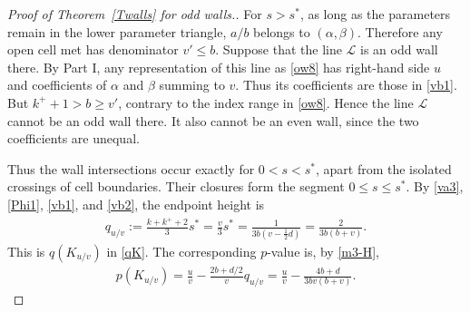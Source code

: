 \documentclass[11pt,reqno,tbtags,a4paper]{amsart}
\numberwithin{equation}{section}
\renewcommand\le{\leq}
\renewcommand\ge{\geq}
\renewcommand\leq{\leqslant}
\renewcommand\geq{\geqslant}
\theoremstyle{plain}%
\theoremstyle{definition}
\theoremstyle{remark}
\newcommand{\refT}[1]{Theorem~\ref{#1}}
\newcounter{cc}
\newcommand\ga{\alpha}
\newcommand\gb{\beta}
\newcommand\LL{{\mathcal L}}
\newcommand\uv{_{u/v}}
\newcommand\kx{{k^+}}
\newcommand\sx{s^*}
\newcommand\0{{\boldsymbol 0}}
\newcommand\1{{\boldsymbol 1}}
\begin{document}
\begin{proof}[Proof of \refT{Twalls} for odd walls.]
For $s>\sx$, as long as the parameters remain in the lower parameter
triangle, $a/b$ belongs to $(\ga,\gb)$.
Therefore any open cell met has denominator $v'\le b$.
Suppose that the line $\LL$ is an odd wall there.
By Part I, any representation of this line as \eqref{ow8} has
right-hand side $u$ and coefficients of $\ga$ and $\gb$ summing to $v$.
Thus its coefficients are those in \eqref{vb1}.
But $\kx+1>b\ge v'$, contrary to the index range in \eqref{ow8}.
Hence the line $\LL$ cannot be an odd wall there.
It also cannot be an even wall, since the two coefficients are unequal.

Thus the wall intersections occur exactly for $0<s<\sx$, apart from the
isolated crossings of cell boundaries. Their closures form the segment
$0\le s\le\sx$.
By \eqref{va3}, \eqref{Phi1}, \eqref{vb1}, and \eqref{vb2},
the endpoint height is
\begin{align}\label{vb5}
 q\uv:=\frac{k+\kx+2}{3}\sx
 =\frac{v}{3}\sx
 =\frac{1}{3b(v-\frac12d)}
 =\frac{2}{3b(b+v)}.
\end{align}
This is $q(K\uv)$ in \eqref{qK}.
The corresponding $p$-value is, by \eqref{m3-H},
\begin{align}\label{vb6}
 p(K\uv)=\frac{u}v-\frac{2b+d/2}{v}q\uv
 =\frac{u}v-\frac{4b+d}{3bv(b+v)}.
\end{align}



\end{proof}
\end{document}
